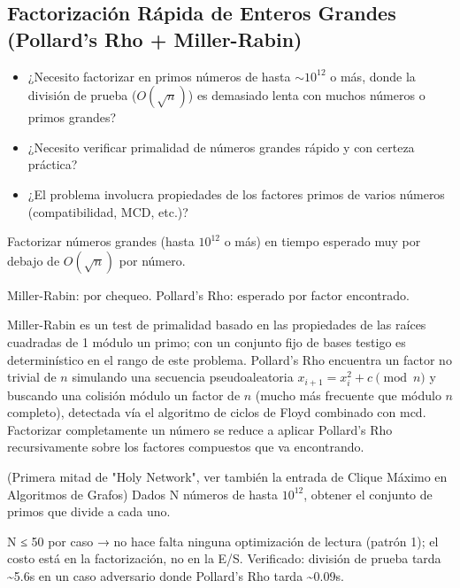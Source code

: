 \subsection{Factorización Rápida de Enteros Grandes (Pollard's Rho + Miller-Rabin)}


\begin{itemize}
\item ¿Necesito factorizar en primos números de hasta $\sim 10^{12}$ o más, donde la división de prueba ($O(\sqrt{n})$) es demasiado lenta con muchos números o primos grandes?
\item ¿Necesito verificar primalidad de números grandes rápido y con certeza práctica?
\item ¿El problema involucra propiedades de los factores primos de varios números (compatibilidad, MCD, etc.)?
\end{itemize}

 Factorizar números grandes (hasta $10^{12}$ o más) en tiempo esperado muy por debajo de $O(\sqrt{n})$ por número.

 Miller-Rabin:  por chequeo. Pollard's Rho:  esperado por factor encontrado.

 Miller-Rabin es un test de primalidad basado en las propiedades de las raíces cuadradas de 1 módulo un primo; con un conjunto fijo de bases testigo es determinístico en el rango de este problema. Pollard's Rho encuentra un factor no trivial de $n$ simulando una secuencia pseudoaleatoria $x_{i+1}=x_i^2+c \pmod n$ y buscando una colisión módulo un factor de $n$ (mucho más frecuente que módulo $n$ completo), detectada vía el algoritmo de ciclos de Floyd combinado con mcd. Factorizar completamente un número se reduce a aplicar Pollard's Rho recursivamente sobre los factores compuestos que va encontrando.


(Primera mitad de "Holy Network", ver también la entrada de Clique Máximo en Algoritmos de Grafos) Dados N números de hasta $10^{12}$, obtener el conjunto de primos que divide a cada uno.

 N ≤ 50 por caso → no hace falta ninguna optimización de lectura (patrón 1); el costo está en la factorización, no en la E/S. Verificado: división de prueba tarda \textasciitilde{}5.6s en un caso adversario donde Pollard's Rho tarda \textasciitilde{}0.09s.

